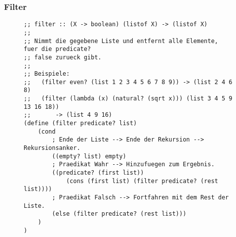 	\subsubsection{Filter}
		\begin{figure}[H]
			\centering
			\begin{lstlisting}[language = Racket]
;; filter :: (X -> boolean) (listof X) -> (listof X)
;;
;; Nimmt die gegebene Liste und entfernt alle Elemente, fuer die predicate?
;; false zurueck gibt.
;;
;; Beispiele:
;;   (filter even? (list 1 2 3 4 5 6 7 8 9)) -> (list 2 4 6 8)
;;   (filter (lambda (x) (natural? (sqrt x))) (list 3 4 5 9 13 16 18))
;;       -> (list 4 9 16)
(define (filter predicate? list)
	(cond
		; Ende der Liste --> Ende der Rekursion --> Rekursionsanker.
		((empty? list) empty)
		; Praedikat Wahr --> Hinzufuegen zum Ergebnis.
		((predicate? (first list))
			(cons (first list) (filter predicate? (rest list))))
		; Praedikat Falsch --> Fortfahren mit dem Rest der Liste.
		(else (filter predicate? (rest list)))
	)
)
\end{lstlisting}
		\end{figure}
